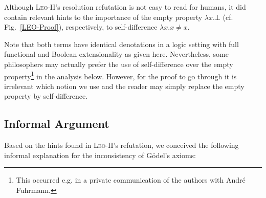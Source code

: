 \documentclass{article}
\begin{document}
Although \textsc{Leo-II}'s resolution refutation is not easy to read
for humans, it did contain relevant hints to the importance of the
empty property $\lambda x. \bot$ (cf. Fig.~\ref{LEO-Proof}),
respectively, to self-difference $\lambda x.  x\not=x$. 

Note that both terms have identical denotations in a logic setting
with full functional and Boolean extensionality as given
here. Nevertheless, some philosophers may actually prefer the use of
self-difference over the empty property\footnote{This occurred e.g. in
  a private communication of the authors with Andr\'e Fuhrmann.} in
the analysis below. However, for the proof to go through it is
irrelevant which notion we use and the reader may simply replace the
empty property by self-difference.



\subsection{Informal Argument}

Based on the hints found in \textsc{Leo-II}'s refutation, we conceived the following informal explanation for the inconsistency of G\"odel's axioms:
\end{document}
